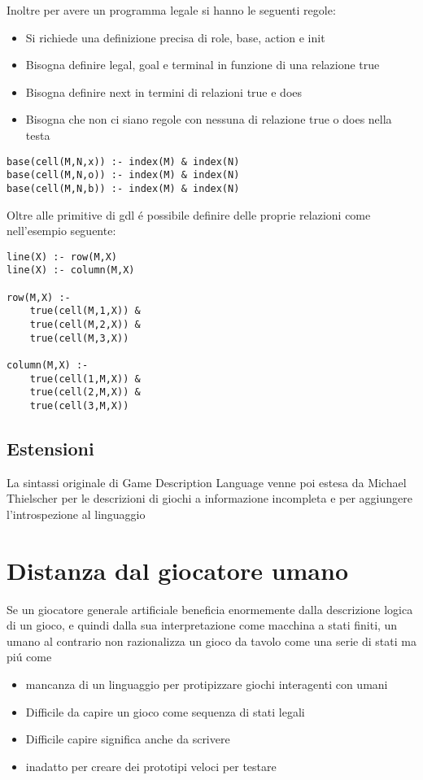 Inoltre per avere un programma legale si hanno le seguenti regole:
\begin{itemize}
    \item Si richiede una definizione precisa di role, base, action e init
    \item Bisogna definire legal, goal e terminal in funzione di una relazione true 
    \item Bisogna definire next in termini di relazioni true e does
    \item Bisogna che non ci siano regole con nessuna di relazione true o does nella testa
\end{itemize} 
\begin{lstlisting}[caption=Esempio: definizione cella di tris]
base(cell(M,N,x)) :- index(M) & index(N)
base(cell(M,N,o)) :- index(M) & index(N)
base(cell(M,N,b)) :- index(M) & index(N)
\end{lstlisting}
Oltre alle primitive di gdl é possibile definire delle proprie relazioni come nell'esempio seguente:
\begin{lstlisting}[caption=colonnet e righe in tris]
line(X) :- row(M,X)
line(X) :- column(M,X)

row(M,X) :- 
    true(cell(M,1,X)) &
    true(cell(M,2,X)) &
    true(cell(M,3,X)) 

column(M,X) :- 
    true(cell(1,M,X)) &
    true(cell(2,M,X)) &
    true(cell(3,M,X)) 
\end{lstlisting} 


\subsection{Estensioni}
La sintassi originale di Game Description Language venne poi estesa da Michael Thielscher per le descrizioni di giochi 
a informazione incompleta \cite*{GDL2} e per aggiungere l'introspezione al linguaggio  \cite*{GDL3}

\section{Distanza dal giocatore umano}
Se un giocatore generale artificiale beneficia enormemente dalla descrizione logica di un gioco, 
e quindi dalla sua interpretazione come macchina a stati finiti, un umano al contrario non razionalizza
un gioco da tavolo come una serie di stati ma piú come 

\begin{itemize}
    \item mancanza di un linguaggio per protipizzare giochi interagenti con umani
    \item Difficile da capire un gioco come sequenza di stati legali
    \item Difficile capire significa anche da scrivere
    \item inadatto per creare dei prototipi veloci per testare 
\end{itemize}